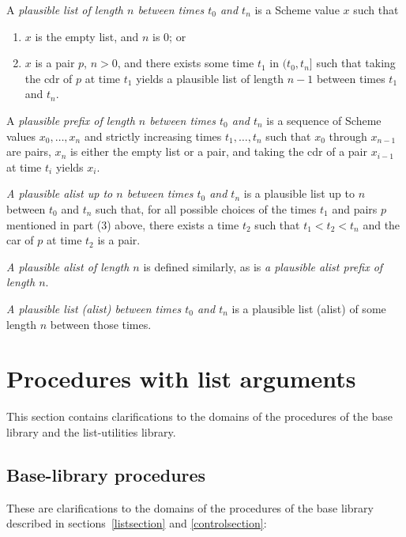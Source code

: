 A \textit{plausible list of length $n$ between times $t_0$ and $t_n$}
is a Scheme value $x$ such that

\begin{enumerate}
\item $x$ is the empty list, and $n$ is $0$; or
\item $x$ is a pair $p$, $n > 0$, and there exists some time
  $t_1$ in $(t_0,t_n]$ such that taking the cdr of $p$ at
  time $t_1$ yields a plausible list of length $n-1$
  between times $t_1$ and $t_n$.
\end{enumerate}

A \textit{plausible prefix of length $n$ between times $t_0$ and
  $t_n$} is a sequence of Scheme values $x_0,\ldots,x_n$ and strictly
increasing times $t_1,\ldots,t_n$ such that $x_0$ through $x_{n-1}$
are pairs, $x_n$ is either the empty list or a pair, and taking the
cdr of a pair $x_{i-1}$ at time $t_i$ yields $x_i$.

\textit{A plausible alist up to $n$ between times $t_0$ and $t_n$} is
a plausible list up to $n$ between $t_0$ and $t_n$ such that, for all
possible choices of the times $t_1$ and pairs $p$ mentioned in part
(3) above, there exists a time $t_2$ such that $t_1 < t_2 < t_n$ and
the car of $p$ at time $t_2$ is a pair.

\textit{A plausible alist of length $n$} is defined similarly, as is
\textit{a plausible alist prefix of length $n$}.

\textit{A plausible list (alist) between times $t_0$ and $t_n$} is a
plausible list (alist) of some length $n$ between those times.

\section{Procedures with list arguments}
\label{proceduresmutablelistargumentssection}

This section contains clarifications to the domains of the procedures of the base
library and the list-utilities library.

\subsection{Base-library procedures}

These are clarifications to the domains of the procedures of the base
library described in sections~\ref{listsection} and \ref{controlsection}:

\begin{entry}{%
}

\end{entry}

